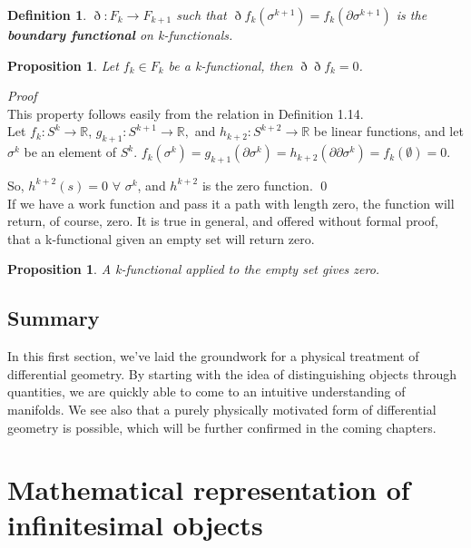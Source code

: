 \documentclass{book}
\newtheorem{defn}[equation]{Definition}
\newtheorem{prop}[equation]{Proposition}
\renewenvironment{proof}{\emph{Proof}}{\qed}
\begin{document}
\begin{defn}
	$\eth : F_k \to F_{k+1}$ such that $\eth f_k(\sigma^{k+1}) = f_k(\partial \sigma^{k+1})$ is the \textbf{boundary functional} on k-functionals. 
\end{defn}

\begin{prop}
	Let $f_k \in F_k$ be a k-functional, then $\eth\eth f_k = 0 $.
	
\end{prop}
\begin{proof}\\
	This property follows easily from the relation in Definition 1.14.\\ 
	Let $f_k : S^k \to \mathbb{R}$, $g_{k+1} : S^{k+1} \to \mathbb{R},$ and $h_{k+2}: S^{k+2} \to \mathbb{R}$ be linear functions, and let $\sigma^k$ be an element of $S^k$. $f_k(\sigma^k) = g_{k+1}(\partial \sigma^k) = h_{k+2}(\partial\partial \sigma^k) = f_k(\emptyset) = 0$. 
	
	So, $h^{k+2}(s) = 0$ $\forall$ $\sigma^k$, and $h^{k+2}$ is the zero function. 
\end{proof}\\

If we have a work function and pass it a path with length zero, the function will return, of course, zero. It is true in general, and offered without formal proof, that a k-functional given an empty set will return zero. 

\begin{prop}
	A k-functional applied to the empty set gives zero. 
\end{prop}





\section{Summary}


In this first section, we've laid the groundwork for a physical treatment of differential geometry. By starting with the idea of distinguishing objects through quantities, we are quickly able to come to an intuitive understanding of manifolds. We see also that a purely physically motivated form of differential geometry is possible, which will be further confirmed in the coming chapters. 


\chapter{Mathematical representation of infinitesimal objects}
\end{document}
